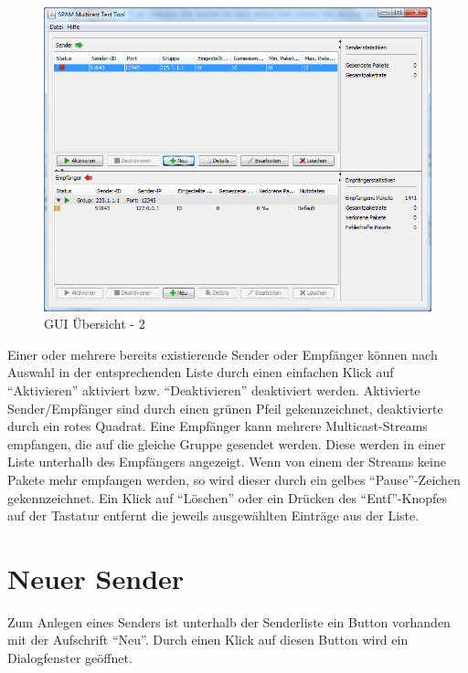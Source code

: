 \begin{figure}[htbp]
\begin{center}
\includegraphics[width=14cm]{images/mainFrameDeactivateSender.png}
\caption[GUI Übersicht - 2]{GUI Übersicht - 2}
\label{overview}
\end{center}
\end{figure}

Einer oder mehrere bereits existierende Sender oder Empfänger können nach
Auswahl in der entsprechenden Liste durch einen einfachen Klick auf ``Aktivieren''
aktiviert bzw. ``Deaktivieren'' deaktiviert werden. Aktivierte
Sender/Empfänger sind durch einen grünen Pfeil gekennzeichnet, deaktivierte
durch ein rotes Quadrat.
\newline
Eine Empfänger kann mehrere Multicast-Streams empfangen, die auf die gleiche
Gruppe gesendet werden. Diese werden in einer Liste unterhalb des
Empfängers angezeigt. Wenn von einem der Streams keine Pakete mehr empfangen
werden, so wird dieser durch ein gelbes ``Pause''-Zeichen gekennzeichnet.
\newline
Ein Klick auf ``Löschen'' oder ein Drücken des ``Entf''-Knopfes auf der Tastatur
entfernt die jeweils ausgewählten Einträge aus der Liste.

\chapter{Neuer Sender}
Zum Anlegen eines Senders ist unterhalb der Senderliste
ein Button vorhanden mit der Aufschrift ``Neu''. Durch einen Klick auf diesen
Button wird ein Dialogfenster geöffnet.

